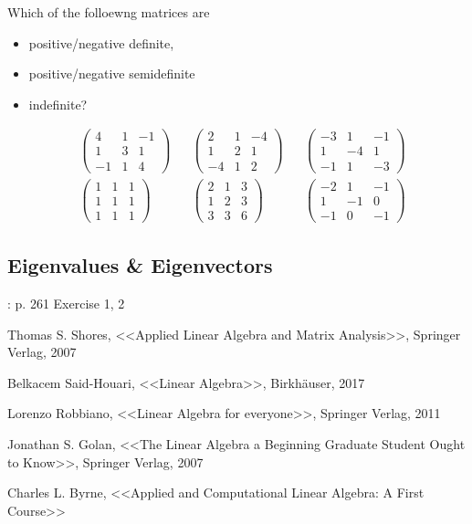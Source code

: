 \documentclass[12pt]{article}
\begin{document}
Which of the folloewng matrices are 
\begin{itemize}
	\item positive/negative definite, 
	\item positive/negative semidefinite
	\item indefinite?
\end{itemize}
\begin{align*}
	&\begin{pmatrix} 4 & 1 & -1 \\ 1 & 3 & 1 \\ -1 & 1 & 4\end{pmatrix} &
	&\begin{pmatrix} 2 & 1 & -4 \\ 1 & 2 & 1 \\ -4 & 1 & 2\end{pmatrix} &
	&\begin{pmatrix} -3 & 1 & -1 \\ 1 & -4 & 1 \\ -1 & 1 & -3\end{pmatrix}  \\
	&\begin{pmatrix} 1 & 1 & 1 \\ 1 & 1 & 1 \\ 1 & 1 & 1\end{pmatrix} &
	&\begin{pmatrix} 2 & 1 & 3 \\ 1 & 2 & 3\\ 3 & 3 & 6 \end{pmatrix}  &
	&\begin{pmatrix} -2 & 1 & -1 \\ 1 & -1 & 0 \\ -1 & 0& -1\end{pmatrix} 
\end{align*}

\subsection{Eigenvalues \& Eigenvectors}

\cite{Shores}: p. 261 Exercise 1, 2

\begin{thebibliography}{99}

 Thomas S. Shores, <<Applied Linear Algebra and
Matrix Analysis>>, Springer Verlag, 2007

 Belkacem Said-Houari, <<Linear Algebra>>,
Birkhäuser, 2017

 Lorenzo Robbiano, <<Linear Algebra for everyone>>,
Springer Verlag, 2011

 Jonathan S. Golan, <<The Linear Algebra a Beginning Graduate Student
Ought to Know>>, Springer Verlag, 2007

 Charles L. Byrne, <<Applied and Computational Linear Algebra:
A First Course>>

\end{thebibliography}
\end{document}
